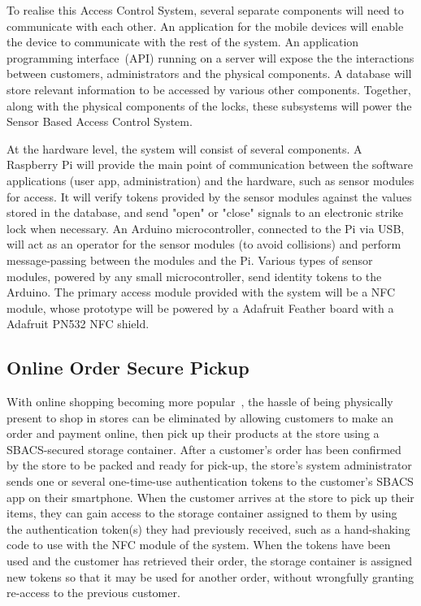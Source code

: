 \documentclass{article}
\begin{document}


To realise this Access Control System, several separate components will need to communicate with each other. An
application for the mobile devices will enable the device to communicate with the rest of the system. An application programming
interface~(API) running on a server will expose the the interactions between customers, administrators and the
physical components. A database will store relevant information to be accessed by various other components. Together,
along with the physical components of the locks, these subsystems will power the Sensor Based Access Control System.

At the hardware level, the system will consist of several components. A Raspberry Pi will provide the main point of 
communication between the software applications (user app, administration) and the hardware, such as sensor modules for 
access. It will verify tokens provided by the sensor modules against the values stored in the database, and send "open" 
or "close" signals to an electronic strike lock when necessary. An Arduino microcontroller, connected to the Pi via 
USB, will act as an operator for the sensor modules (to avoid collisions) and perform message-passing between the 
modules and the Pi. Various types of sensor modules, powered by any small microcontroller, send identity tokens to the 
Arduino. The primary access module provided with the system will be a NFC module, whose prototype will be powered by a 
Adafruit Feather board with a Adafruit PN532 NFC shield.

\subsection{Online Order Secure Pickup}

With online shopping becoming more popular~\autocite{CUSTORA}, the hassle of being physically present to shop in stores 
can be eliminated by allowing customers to make an order and payment online, then pick up their products at the store 
using a SBACS-secured storage container. After a customer's order has been confirmed by the store to be packed 
and ready for pick-up, the store's system administrator sends one or several one-time-use authentication tokens 
to the customer's SBACS app on their smartphone. When the customer arrives at the store to pick up their items, 
they can gain access to the storage container assigned to them by using the authentication token(s) they had previously 
received, such as a hand-shaking code to use with the NFC module of the system. When the tokens have been used and the 
customer has retrieved their order, the storage container is assigned new tokens so that it may be used for another 
order, without wrongfully granting re-access to the previous customer.
\end{document}
